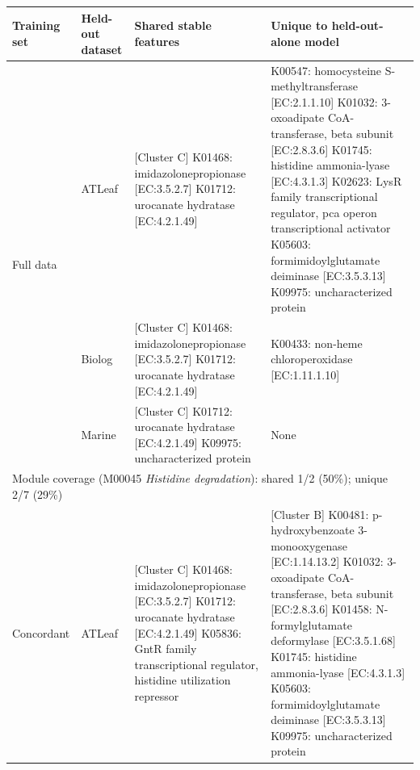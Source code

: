 \begin{table}[p]
\centering
\scriptsize
\setlength{\tabcolsep}{3pt}
\begin{tabularx}{\linewidth}{llXX}
\hline
\textbf{Training set} & \textbf{Held-out dataset} & \textbf{Shared stable features} & \textbf{Unique to held-out-alone model} \\
\hline
\multirow{3}{*}{Full data} & ATLeaf & [Cluster C] K01468: imidazolonepropionase [EC:3.5.2.7] \newline [Cluster C] K01712: urocanate hydratase [EC:4.2.1.49] & K00547: homocysteine S-methyltransferase [EC:2.1.1.10] \newline [Cluster B] K01032: 3-oxoadipate CoA-transferase, beta subunit [EC:2.8.3.6] \newline [Cluster C] K01745: histidine ammonia-lyase [EC:4.3.1.3] \newline K02623: LysR family transcriptional regulator, pca operon transcriptional activator \newline [Cluster A] K05603: formimidoylglutamate deiminase [EC:3.5.3.13] \newline K09975: uncharacterized protein \\
 & Biolog & [Cluster C] K01468: imidazolonepropionase [EC:3.5.2.7] \newline [Cluster C] K01712: urocanate hydratase [EC:4.2.1.49] & K00433: non-heme chloroperoxidase [EC:1.11.1.10] \\
 & Marine & [Cluster C] K01712: urocanate hydratase [EC:4.2.1.49] \newline K09975: uncharacterized protein & None \\
\multicolumn{4}{l}{\footnotesize Module coverage (M00045 \textit{Histidine degradation}): shared 1/2 (50\%); unique 2/7 (29\%)} \\
\hline
\multirow{3}{*}{Concordant} & ATLeaf & [Cluster C] K01468: imidazolonepropionase [EC:3.5.2.7] \newline [Cluster C] K01712: urocanate hydratase [EC:4.2.1.49] \newline K05836: GntR family transcriptional regulator, histidine utilization repressor & [Cluster B] K00481: p-hydroxybenzoate 3-monooxygenase [EC:1.14.13.2] \newline [Cluster B] K01032: 3-oxoadipate CoA-transferase, beta subunit [EC:2.8.3.6] \newline [Cluster A] K01458: N-formylglutamate deformylase [EC:3.5.1.68] \newline [Cluster C] K01745: histidine ammonia-lyase [EC:4.3.1.3] \newline [Cluster A] K05603: formimidoylglutamate deiminase [EC:3.5.3.13] \newline K09975: uncharacterized protein \\

\end{tabularx}
\end{table}
